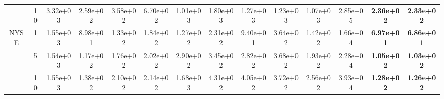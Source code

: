 \begin{table*}[!t]
{\begin{tabular}{cccccccccccccc}
 & 10 & 3.32e+03& 2.59e+02 & 3.58e+02 & 6.70e+02 & 1.01e+03& 1.80e+03& 1.27e+03 & 1.23e+03 & 1.07e+03& 2.85e+05 & \textbf{2.36e+02} & \textbf{2.33e+02}\s \\ \cmidrule(l){2-14}
\multirow{3}{*}{NYSE}& 1& 1.55e+03& 8.98e+01 & 1.33e+02 & 1.84e+02 & 1.27e+02& 2.31e+02& 9.40e+01 & 3.64e+02 & 1.42e+02& 1.66e+04 & \textbf{6.97e+01} & \textbf{6.86e+01}\s \\ \cmidrule(l){3-14}
 & 5& 1.54e+03& 1.17e+02 & 1.76e+02 & 2.02e+02 & 2.90e+02& 3.45e+02& 2.82e+02 & 3.68e+02 & 1.93e+02& 2.28e+04 & \textbf{1.05e+02} & \textbf{1.03e+02}\s\\ \cmidrule(l){3-14}
 & 10 & 1.55e+03& 1.38e+02 & 2.10e+02 & 2.14e+02 & 1.68e+03& 4.31e+02& 4.05e+02 & 3.72e+02 & 2.56e+02& 3.93e+04 & \textbf{1.28e+02} & \textbf{1.26e+02}\s \\ \bottomrule
\end{tabular}}
\end{table*}